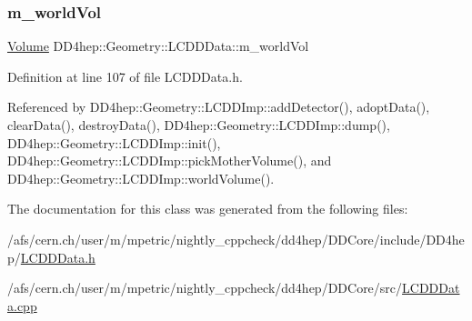 \subsubsection{\texorpdfstring{m\+\_\+world\+Vol}{m\_worldVol}}
{\footnotesize\ttfamily \hyperlink{class_d_d4hep_1_1_geometry_1_1_volume}{Volume} D\+D4hep\+::\+Geometry\+::\+L\+C\+D\+D\+Data\+::m\+\_\+world\+Vol\hspace{0.3cm}{\ttfamily [protected]}}



Definition at line 107 of file L\+C\+D\+D\+Data.\+h.



Referenced by D\+D4hep\+::\+Geometry\+::\+L\+C\+D\+D\+Imp\+::add\+Detector(), adopt\+Data(), clear\+Data(), destroy\+Data(), D\+D4hep\+::\+Geometry\+::\+L\+C\+D\+D\+Imp\+::dump(), D\+D4hep\+::\+Geometry\+::\+L\+C\+D\+D\+Imp\+::init(), D\+D4hep\+::\+Geometry\+::\+L\+C\+D\+D\+Imp\+::pick\+Mother\+Volume(), and D\+D4hep\+::\+Geometry\+::\+L\+C\+D\+D\+Imp\+::world\+Volume().



The documentation for this class was generated from the following files\+:\begin{DoxyCompactItemize}
\item 
/afs/cern.\+ch/user/m/mpetric/nightly\+\_\+cppcheck/dd4hep/\+D\+D\+Core/include/\+D\+D4hep/\hyperlink{_l_c_d_d_data_8h}{L\+C\+D\+D\+Data.\+h}\item 
/afs/cern.\+ch/user/m/mpetric/nightly\+\_\+cppcheck/dd4hep/\+D\+D\+Core/src/\hyperlink{_l_c_d_d_data_8cpp}{L\+C\+D\+D\+Data.\+cpp}\end{DoxyCompactItemize}
